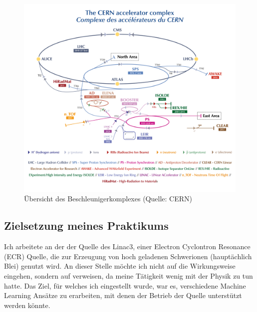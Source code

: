 \documentclass[11pt, a4paper, titlepage, headings=standardclasses]{scrartcl}
\begin{document}
\begin{figure}
    \centering
    \includegraphics{cern_acc_complex.png}
    \caption{Übersicht des Beschleunigerkomplexes (Quelle: CERN)}
    \label{fig:cern_acc_complex}
\end{figure}

\subsection*{Zielsetzung meines Praktikums}

Ich arbeitete an der der Quelle des Linac3, einer Electron Cyclontron Resonance (ECR) Quelle, die zur Erzeugung von hoch geladenen Schwerionen (hauptächlich Blei) genutzt wird. An dieser Stelle möchte ich nicht auf die Wirkungsweise eingehen, sondern auf \cite{Brown:IonSources} verweisen, da meine Tätigkeit wenig mit der Physik zu tun hatte. Das Ziel, für welches ich eingestellt wurde, war es, verschiedene Machine Learning Ansätze zu erarbeiten, mit denen der Betrieb der Quelle unterstützt werden könnte.
\end{document}
